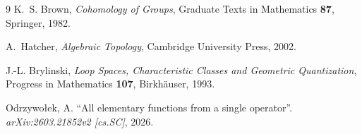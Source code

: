 \documentclass[11pt]{article}
\begin{document}
\begin{thebibliography}{9}
K.~S. Brown,
\textit{Cohomology of Groups},
Graduate Texts in Mathematics \textbf{87}, Springer, 1982.

A.~Hatcher,
\textit{Algebraic Topology},
Cambridge University Press, 2002.

J.-L. Brylinski,
\textit{Loop Spaces, Characteristic Classes and Geometric Quantization},
Progress in Mathematics \textbf{107}, Birkh\"{a}user, 1993.

Odrzywo{\l}ek, A.
``All elementary functions from a single operator''.
\textit{arXiv:2603.21852v2 [cs.SC]}, 2026.

\end{thebibliography}
\end{document}
